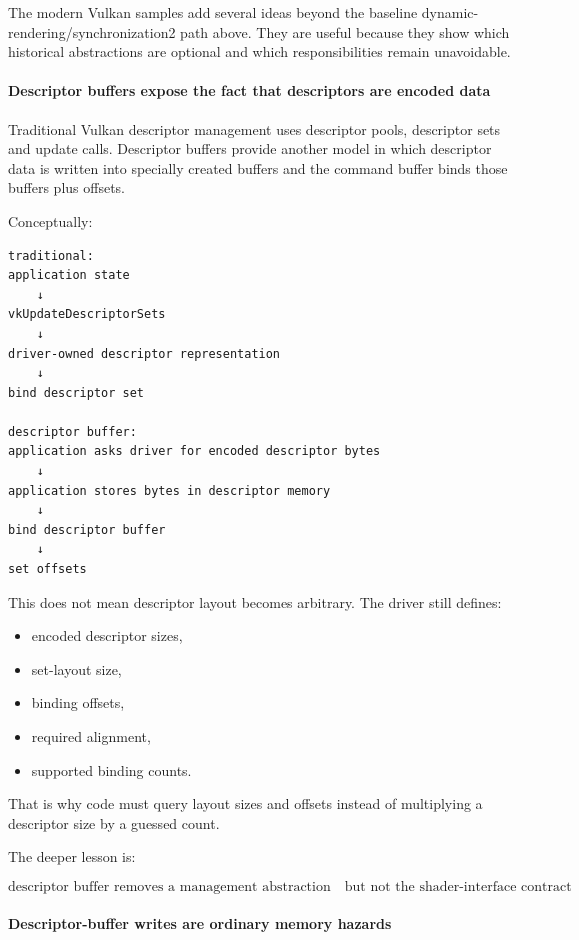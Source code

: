The modern Vulkan samples add several ideas beyond the baseline dynamic-rendering/synchronization2 path above. They are useful because they show which historical abstractions are optional and which responsibilities remain unavoidable.

\paragraph{Descriptor buffers expose the fact that descriptors are encoded data}\label{descriptor-buffers-expose-the-fact-that-descriptors-are-encoded-data}

Traditional Vulkan descriptor management uses descriptor pools, descriptor sets and update calls. Descriptor buffers provide another model in which descriptor data is written into specially created buffers and the command buffer binds those buffers plus offsets.

Conceptually:

\begin{verbatim}
traditional:
application state
    ↓
vkUpdateDescriptorSets
    ↓
driver-owned descriptor representation
    ↓
bind descriptor set

descriptor buffer:
application asks driver for encoded descriptor bytes
    ↓
application stores bytes in descriptor memory
    ↓
bind descriptor buffer
    ↓
set offsets
\end{verbatim}

This does not mean descriptor layout becomes arbitrary. The driver still defines:

\begin{itemize}
\tightlist
\item
  encoded descriptor sizes,
\item
  set-layout size,
\item
  binding offsets,
\item
  required alignment,
\item
  supported binding counts.
\end{itemize}

That is why code must query layout sizes and offsets instead of multiplying a descriptor size by a guessed count.

The deeper lesson is:

\[
\boxed{
\text{descriptor buffer removes a management abstraction}
\quad
\text{but not the shader-interface contract}
}
\]

\paragraph{Descriptor-buffer writes are ordinary memory hazards}\label{descriptor-buffer-writes-are-ordinary-memory-hazards}

